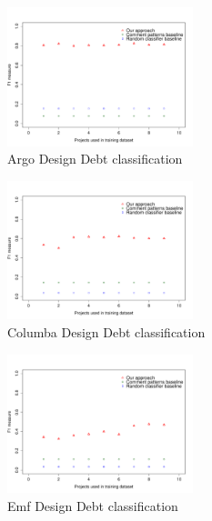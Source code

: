\begin{figure}[thb!]
  \centering
  \includegraphics[width=0.48\textwidth]{figures/appendix/iteration_details/design_argo.pdf}
  \vspace{-3mm}
  \caption{Argo Design Debt classification}
  \label{fig:design_argo}
\end{figure}

\begin{figure}[thb!]
  \centering
  \includegraphics[width=0.48\textwidth]{figures/appendix/iteration_details/design_columba.pdf}
  \vspace{-3mm}
  \caption{Columba Design Debt classification}
  \label{fig:design_columba}
\end{figure}

\begin{figure}[thb!]
  \centering
  \includegraphics[width=0.48\textwidth]{figures/appendix/iteration_details/design_emf.pdf}
  \vspace{-3mm}
  \caption{Emf Design Debt classification}
  \label{fig:design_emf}
\end{figure}

